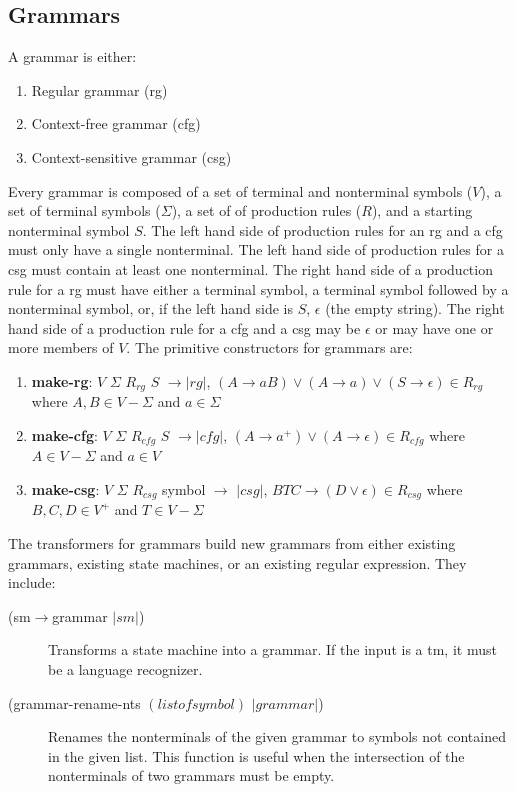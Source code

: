 \documentclass{eptcs}
\begin{document}
\subsection{Grammars}
A grammar is either:
 \begin{enumerate}
   \item Regular grammar (\textsf{rg})
   \item Context-free grammar (\textsf{cfg})
   \item Context-sensitive grammar (\textsf{csg})
 \end{enumerate}
Every grammar is composed of a set of terminal and nonterminal symbols ($V$), a set of terminal symbols ($\Sigma$), a set of of production rules ($R$), and a starting nonterminal symbol $S$. The left hand side of production rules for an \textsf{rg} and a \textsf{cfg} must only have a single nonterminal. The left hand side of production rules for a \textsf{csg} must contain at least one nonterminal. The right hand side of a production rule for a \textsf{rg} must have either a terminal symbol, a terminal symbol followed by a nonterminal symbol, or, if the left hand side is $S$, $\epsilon$ (the empty string). The right hand side of a production rule for a \textsf{cfg} and a \textsf{csg} may be $\epsilon$ or may have one or more members of $V$. The primitive constructors for grammars are:
\begin{enumerate}
  \item \textbf{make-rg}: $V$ $\Sigma$ $R_{\mathit{rg}}$ $S$ $\rightarrow$$|\mathit{rg}|$, \newline $(A \rightarrow aB) \vee (A \rightarrow a) \vee (S \rightarrow \epsilon) \in R_{\mathit{rg}}$ where $A, B \in V-\Sigma$ and $a \in \Sigma$

  \item \textbf{make-cfg}: $V$ $\Sigma$ $R_{\mathit{cfg}}$ $S$ $\rightarrow$$|\mathit{cfg}|$, \newline $(A \rightarrow a^+) \vee (A \rightarrow \epsilon) \in R_{\mathit{cfg}}$ where $A \in V-\Sigma$ and $a \in V$

  \item \textbf{make-csg}: $V$ $\Sigma$ $R_{\mathit{csg}}$ symbol $\rightarrow$ $|\mathit{csg}|$, \newline $BTC \rightarrow (D \vee \epsilon) \in R_{\mathit{csg}}$ where $B, C, D \in V^+$ and $T \in V-\Sigma$
\end{enumerate}

The transformers for grammars build new grammars from either existing grammars, existing state machines, or an existing regular expression. They include:
\begin{description}
  \item[(sm$\rightarrow$grammar $|sm|$)] Transforms a state machine into a grammar. If the input is a \textsf{tm}, it must be a language recognizer.

  \item[(grammar-rename-nts $(\mathit{listof} \mathit{symbol})$ $|grammar|$)] Renames the nonterminals of the given grammar to symbols not contained in the given list. This function is useful when the intersection of the nonterminals of two grammars must be empty.
\end{description}
\end{document}
